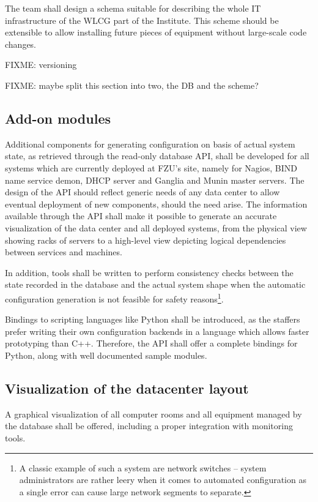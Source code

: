 \documentclass{article}
\begin{document}
The team shall design a schema suitable for describing the whole IT infrastructure of the WLCG part of the Institute.  This scheme
should be extensible to allow installing future pieces of equipment without large-scale code changes.

FIXME: versioning

FIXME: maybe split this section into two, the DB and the scheme?

\subsection{Add-on modules}

Additional components for generating configuration on basis of actual system state, as retrieved through the
read-only database API, shall be developed for all systems which are currently deployed at FZU's site, namely for Nagios, BIND
name service demon, DHCP server and Ganglia and Munin master servers.  The design of the API should reflect generic needs of any
data center to allow eventual deployment of new components, should the need arise.  The information available through the API
shall make it possible to generate an accurate visualization of the data center and all deployed systems, from the physical view
showing racks of servers to a high-level view depicting logical dependencies between services and machines.

In addition, tools shall be written to perform consistency checks between the state recorded in the database and the actual system
shape when the automatic configuration generation is not feasible for safety reasons\footnote{A classic example of such a system
are network switches -- system administrators are rather leery when it comes to automated configuration as a single error can
cause large network segments to separate.}.

Bindings to scripting languages like Python shall be introduced, as the staffers prefer writing their own configuration backends
in a language which allows faster prototyping than C++.  Therefore, the API shall offer a complete bindings for Python, along with
well documented sample modules.

\subsection{Visualization of the datacenter layout}

A graphical visualization of all computer rooms and all equipment managed by the database shall be offered, including a proper
integration with monitoring tools.
\end{document}
